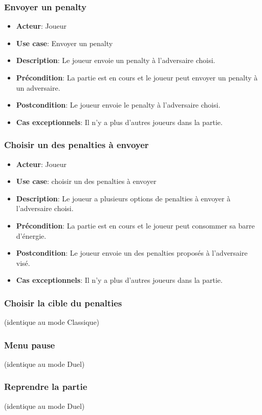 \documentclass{article}
\begin{document}
\subsubsection*{Envoyer un penalty}
\begin{itemize}
    \item \textbf{Acteur}: Joueur
    \item \textbf{Use case}: Envoyer un penalty
    \item \textbf{Description}: Le joueur envoie un penalty à l'adversaire choisi.
    \item \textbf{Précondition}: La partie est en cours et le joueur peut envoyer un penalty à un adversaire.
    \item \textbf{Postcondition}: Le joueur envoie le penalty à l'adversaire choisi.
    \item \textbf{Cas exceptionnels}: Il n'y a plus d'autres joueurs dans la partie. 
\end{itemize}

\subsubsection*{Choisir un des penalties à envoyer}
\begin{itemize}
    \item \textbf{Acteur}: Joueur
    \item \textbf{Use case}: choisir un des penalties à envoyer
    \item \textbf{Description}: Le joueur a plusieurs options de penalties à envoyer à l'adversaire choisi.
    \item \textbf{Précondition}: La partie est en cours et le joueur peut consommer sa barre d'énergie.
    \item \textbf{Postcondition}: Le joueur envoie un des penalties proposés à l'adversaire visé.
    \item \textbf{Cas exceptionnels}: Il n'y a plus d'autres joueurs dans la partie.
\end{itemize}

\subsubsection*{Choisir la cible du penalties} (identique au mode Classique)
\subsubsection*{Menu pause} (identique au mode Duel)
\subsubsection*{Reprendre la partie} (identique au mode Duel)
\end{document}
